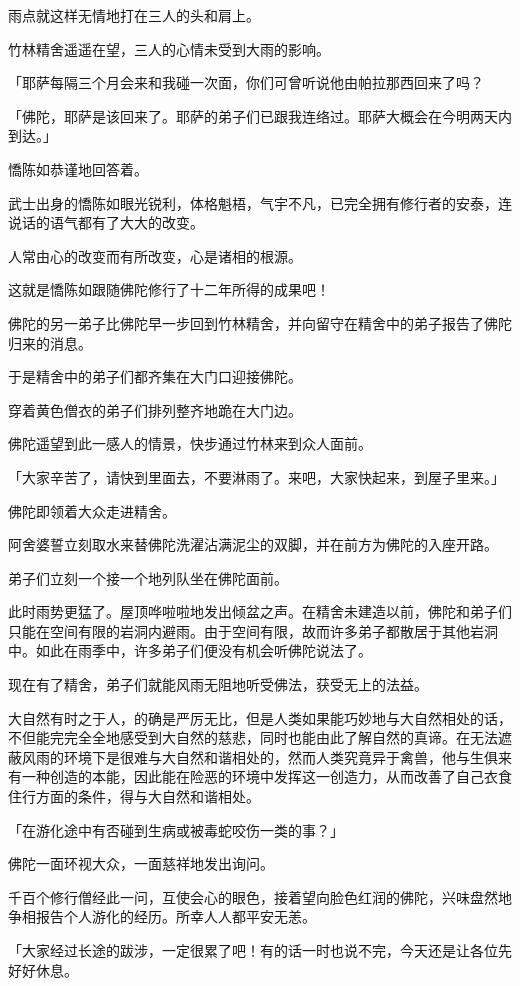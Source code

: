 \documentclass[twoside,openany]{book}
\begin{document}
雨点就这样无情地打在三人的头和肩上。

竹林精舍遥遥在望，三人的心情未受到大雨的影响。

「耶萨每隔三个月会来和我碰一次面，你们可曾听说他由帕拉那西回来了吗？

「佛陀，耶萨是该回来了。耶萨的弟子们已跟我连络过。耶萨大概会在今明两天内到达。」

憍陈如恭谨地回答着。

武士出身的憍陈如眼光锐利，体格魁梧，气宇不凡，已完全拥有修行者的安泰，连说话的语气都有了大大的改变。

人常由心的改变而有所改变，心是诸相的根源。

这就是憍陈如跟随佛陀修行了十二年所得的成果吧！

佛陀的另一弟子比佛陀早一步回到竹林精舍，并向留守在精舍中的弟子报告了佛陀归来的消息。

于是精舍中的弟子们都齐集在大门口迎接佛陀。

穿着黄色僧衣的弟子们排列整齐地跪在大门边。

佛陀遥望到此一感人的情景，快步通过竹林来到众人面前。

「大家辛苦了，请快到里面去，不要淋雨了。来吧，大家快起来，到屋子里来。」

佛陀即领着大众走进精舍。

阿舍婆誓立刻取水来替佛陀洗濯沾满泥尘的双脚，并在前方为佛陀的入座开路。

弟子们立刻一个接一个地列队坐在佛陀面前。

此时雨势更猛了。屋顶哗啦啦地发出倾盆之声。在精舍未建造以前，佛陀和弟子们只能在空间有限的岩洞内避雨。由于空间有限，故而许多弟子都散居于其他岩洞中。如此在雨季中，许多弟子们便没有机会听佛陀说法了。

现在有了精舍，弟子们就能风雨无阻地听受佛法，获受无上的法益。

大自然有时之于人，的确是严厉无比，但是人类如果能巧妙地与大自然相处的话，不但能完完全全地感受到大自然的慈悲，同时也能由此了解自然的真谛。在无法遮蔽风雨的环境下是很难与大自然和谐相处的，然而人类究竟异于禽兽，他与生俱来有一种创造的本能，因此能在险恶的环境中发挥这一创造力，从而改善了自己衣食住行方面的条件，得与大自然和谐相处。

「在游化途中有否碰到生病或被毒蛇咬伤一类的事？」

佛陀一面环视大众，一面慈祥地发出询问。

千百个修行僧经此一问，互使会心的眼色，接着望向脸色红润的佛陀，兴味盘然地争相报告个人游化的经历。所幸人人都平安无恙。

「大家经过长途的跋涉，一定很累了吧！有的话一时也说不完，今天还是让各位先好好休息。
\end{document}
